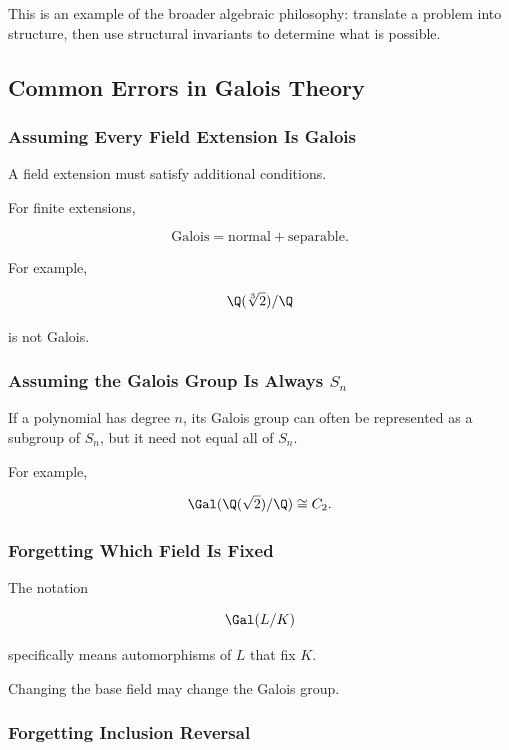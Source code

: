 This is an example of the broader algebraic philosophy: translate a problem
into structure, then use structural invariants to determine what is possible.

\subsection{Common Errors in Galois Theory}
\label{subsec:common-galois-errors}

\subsubsection{Assuming Every Field Extension Is Galois}

A field extension must satisfy additional conditions.

For finite extensions,

\[ \text{Galois}=\text{normal}+\text{separable}. \]

For example,

\[ \Q(\sqrt[3]{2})/\Q \]

is not Galois.

\subsubsection{Assuming the Galois Group Is Always \(S_n\)}

If a polynomial has degree \(n\), its Galois group can often be represented
as a subgroup of \(S_n\), but it need not equal all of \(S_n\).

For example,

\[ \Gal(\Q(\sqrt2)/\Q)\cong C_2. \]

\subsubsection{Forgetting Which Field Is Fixed}

The notation

\[ \Gal(L/K) \]

specifically means automorphisms of \(L\) that fix \(K\).

Changing the base field may change the Galois group.

\subsubsection{Forgetting Inclusion Reversal}

